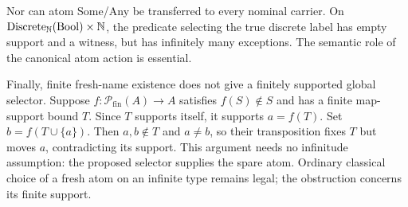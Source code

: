 Nor can atom Some/Any be transferred to every nominal carrier. On
$\operatorname{Discrete}_{\mathbb N}(\mathrm{Bool})\times\mathbb N$, the predicate selecting
the true discrete label has empty support and a witness, but has infinitely
many exceptions. The semantic role of the canonical atom action is essential.

Finally, finite fresh-name existence does not give a finitely supported global
selector. Suppose $f:\mathcal P_{\mathrm{fin}}(A)\to A$ satisfies $f(S)\notin S$
and has a finite map-support bound $T$. Since $T$ supports itself, it supports
$a=f(T)$. Set $b=f(T\cup\{a\})$. Then $a,b\notin T$ and $a\ne b$, so their
transposition fixes $T$ but moves $a$, contradicting its support. This argument
needs no infinitude assumption: the proposed selector supplies the spare atom.
Ordinary classical choice of a fresh atom on an infinite type remains legal;
the obstruction concerns its finite support.
